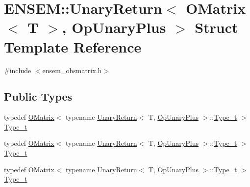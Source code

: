 \hypertarget{structENSEM_1_1UnaryReturn_3_01OMatrix_3_01T_01_4_00_01OpUnaryPlus_01_4}{}\section{E\+N\+S\+EM\+:\+:Unary\+Return$<$ O\+Matrix$<$ T $>$, Op\+Unary\+Plus $>$ Struct Template Reference}
\label{structENSEM_1_1UnaryReturn_3_01OMatrix_3_01T_01_4_00_01OpUnaryPlus_01_4}


{\ttfamily \#include $<$ensem\+\_\+obsmatrix.\+h$>$}

\subsection*{Public Types}
\begin{DoxyCompactItemize}
\item 
typedef \mbox{\hyperlink{classENSEM_1_1OMatrix}{O\+Matrix}}$<$ typename \mbox{\hyperlink{structENSEM_1_1UnaryReturn}{Unary\+Return}}$<$ T, \mbox{\hyperlink{structENSEM_1_1OpUnaryPlus}{Op\+Unary\+Plus}} $>$\+::\mbox{\hyperlink{structENSEM_1_1UnaryReturn_3_01OMatrix_3_01T_01_4_00_01OpUnaryPlus_01_4_a2ba28aeb9736737902accf36b7c69fa1}{Type\+\_\+t}} $>$ \mbox{\hyperlink{structENSEM_1_1UnaryReturn_3_01OMatrix_3_01T_01_4_00_01OpUnaryPlus_01_4_a2ba28aeb9736737902accf36b7c69fa1}{Type\+\_\+t}}
\item 
typedef \mbox{\hyperlink{classENSEM_1_1OMatrix}{O\+Matrix}}$<$ typename \mbox{\hyperlink{structENSEM_1_1UnaryReturn}{Unary\+Return}}$<$ T, \mbox{\hyperlink{structENSEM_1_1OpUnaryPlus}{Op\+Unary\+Plus}} $>$\+::\mbox{\hyperlink{structENSEM_1_1UnaryReturn_3_01OMatrix_3_01T_01_4_00_01OpUnaryPlus_01_4_a2ba28aeb9736737902accf36b7c69fa1}{Type\+\_\+t}} $>$ \mbox{\hyperlink{structENSEM_1_1UnaryReturn_3_01OMatrix_3_01T_01_4_00_01OpUnaryPlus_01_4_a2ba28aeb9736737902accf36b7c69fa1}{Type\+\_\+t}}
\item 
typedef \mbox{\hyperlink{classENSEM_1_1OMatrix}{O\+Matrix}}$<$ typename \mbox{\hyperlink{structENSEM_1_1UnaryReturn}{Unary\+Return}}$<$ T, \mbox{\hyperlink{structENSEM_1_1OpUnaryPlus}{Op\+Unary\+Plus}} $>$\+::\mbox{\hyperlink{structENSEM_1_1UnaryReturn_3_01OMatrix_3_01T_01_4_00_01OpUnaryPlus_01_4_a2ba28aeb9736737902accf36b7c69fa1}{Type\+\_\+t}} $>$ \mbox{\hyperlink{structENSEM_1_1UnaryReturn_3_01OMatrix_3_01T_01_4_00_01OpUnaryPlus_01_4_a2ba28aeb9736737902accf36b7c69fa1}{Type\+\_\+t}}
\end{DoxyCompactItemize}


